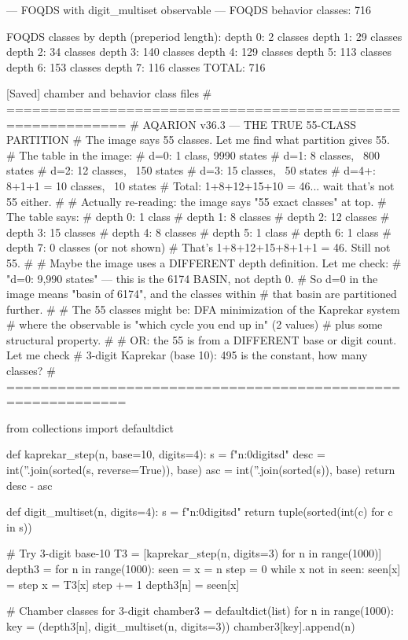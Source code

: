{{{{{{{{{{{{{--- FOQDS with digit_multiset observable ---
FOQDS behavior classes: 716

FOQDS classes by depth (preperiod length):
  depth 0: 2 classes
  depth 1: 29 classes
  depth 2: 34 classes
  depth 3: 140 classes
  depth 4: 129 classes
  depth 5: 113 classes
  depth 6: 153 classes
  depth 7: 116 classes
  TOTAL: 716

[Saved] chamber and behavior class files
# ============================================================
# AQARION v36.3 — THE TRUE 55-CLASS PARTITION
# The image says 55 classes. Let me find what partition gives 55.
# The table in the image:
#   d=0: 1 class, 9990 states
#   d=1: 8 classes, ~800 states  
#   d=2: 12 classes, ~150 states
#   d=3: 15 classes, ~50 states
#   d=4+: 8+1+1 = 10 classes, ~10 states
# Total: 1+8+12+15+10 = 46... wait that's not 55 either.
#
# Actually re-reading: the image says "55 exact classes" at top.
# The table says:
#   depth 0: 1 class
#   depth 1: 8 classes  
#   depth 2: 12 classes
#   depth 3: 15 classes
#   depth 4: 8 classes
#   depth 5: 1 class
#   depth 6: 1 class
#   depth 7: 0 classes (or not shown)
# That's 1+8+12+15+8+1+1 = 46. Still not 55.
#
# Maybe the image uses a DIFFERENT depth definition. Let me check:
# "d=0: 9,990 states" — this is the 6174 BASIN, not depth 0.
# So d=0 in the image means "basin of 6174", and the classes within
# that basin are partitioned further.
#
# The 55 classes might be: DFA minimization of the Kaprekar system
# where the observable is "which cycle you end up in" (2 values)
# plus some structural property.
#
# OR: the 55 is from a DIFFERENT base or digit count. Let me check
# 3-digit Kaprekar (base 10): 495 is the constant, how many classes?
# ============================================================

from collections import defaultdict

def kaprekar_step(n, base=10, digits=4):
    s = f"{n:0{digits}d}"
    desc = int(''.join(sorted(s, reverse=True)), base)
    asc = int(''.join(sorted(s)), base)
    return desc - asc

def digit_multiset(n, digits=4):
    s = f"{n:0{digits}d}"
    return tuple(sorted(int(c) for c in s))

# Try 3-digit base-10
T3 = [kaprekar_step(n, digits=3) for n in range(1000)]
depth3 = {}
for n in range(1000):
    seen = {}
    x = n
    step = 0
    while x not in seen:
        seen[x] = step
        x = T3[x]
        step += 1
    depth3[n] = seen[x]

# Chamber classes for 3-digit
chamber3 = defaultdict(list)
for n in range(1000):
    key = (depth3[n], digit_multiset(n, digits=3))
    chamber3[key].append(n)

}}}}}}}}}}}}}
